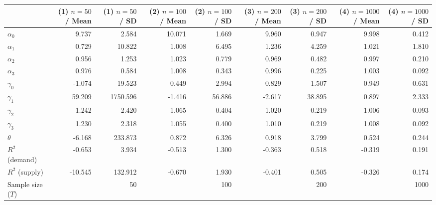 
\begin{tabular}[t]{lrrrrrrrr}
\toprule
  & (1) $n=50$ / Mean & (1) $n=50$ / SD & (2) $n=100$ / Mean & (2) $n=100$ / SD & (3) $n=200$ / Mean & (3) $n=200$ / SD & (4) $n=1000$ / Mean & (4) $n=1000$ / SD\\
\midrule
$\alpha_{0}$ & 9.737 & 2.584 & 10.071 & 1.669 & 9.960 & 0.947 & 9.998 & 0.412\\
$\alpha_{1}$ & 0.729 & 10.822 & 1.008 & 6.495 & 1.236 & 4.259 & 1.021 & 1.810\\
$\alpha_{2}$ & 0.956 & 1.253 & 1.023 & 0.779 & 0.969 & 0.482 & 0.997 & 0.210\\
$\alpha_{3}$ & 0.976 & 0.584 & 1.008 & 0.343 & 0.996 & 0.225 & 1.003 & 0.092\\
$\gamma_{0}$ & -1.074 & 19.523 & 0.449 & 2.994 & 0.829 & 1.507 & 0.949 & 0.631\\
$\gamma_{1}$ & 59.209 & 1750.596 & -1.416 & 56.886 & -2.617 & 38.895 & 0.897 & 2.333\\
$\gamma_{2}$ & 1.242 & 2.420 & 1.065 & 0.404 & 1.020 & 0.219 & 1.006 & 0.093\\
$\gamma_{3}$ & 1.230 & 2.318 & 1.055 & 0.400 & 1.010 & 0.219 & 1.008 & 0.092\\
$\theta$ & -6.168 & 233.873 & 0.872 & 6.326 & 0.918 & 3.799 & 0.524 & 0.244\\
$R^{2}$ (demand) & -0.653 & 3.934 & -0.513 & 1.300 & -0.363 & 0.518 & -0.319 & 0.191\\
$R^{2}$ (supply) & -10.545 & 132.912 & -0.670 & 1.930 & -0.401 & 0.505 & -0.326 & 0.174\\
Sample size ($T$) &  & 50 &  & 100 &  & 200 &  & 1000\\
\bottomrule
\end{tabular}
